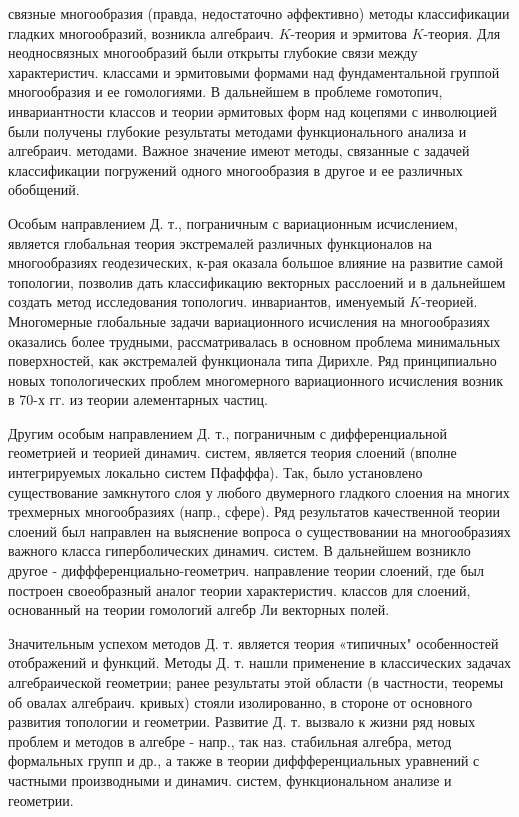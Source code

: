 \documentclass[10pt]{article}
\begin{document}
связные многообразия (правда, недостаточно әффективно) методы классификации гладких многообразий, возникла алгебраич. $K$-теория и эрмитова $K$-теория. Для неодносвязных многообразий были открыты глубокие связи между характеристич. классами и эрмитовыми формами над фундаментальной группой многообразия и ее гомологиями. В дальнейшем в проблеме гомотопич, инвариантности классов и теории әрмитовых форм над коцепями с инволюцией были получены глубокие результаты методами функционального анализа и алгебраич. методами. Важное значение имеют методы, связанные с задачей классификации погружений одного многообразия в другое и ее различных обобщений.



Особым направлением Д. т., пограничным с вариационным исчислением, является глобальная теория экстремалей различных функционалов на многообразиях геодезических, к-рая оказала большое влияние на развитие самой топологии, позволив дать классификацию векторных расслоений и в дальнейшем создать метод исследования топологич. инвариантов, именуемый $K$-теорией. Многомерные глобальные задачи вариационного исчисления на многообразиях оказались более трудными, рассматривалась в основном проблема минимальных поверхностей, как әкстремалей функционала типа Дирихле. Ряд принципиально новых топологических проблем многомерного вариационного исчисления возник в 70-х гг. из теории алементарных частиц.



Другим особым направлением Д. т., пограничным с дифференциальной геометрией и теорией динамич. систем, является теория слоений (вполне интегрируемых локально систем Пфафффа). Так, было установлено существование замкнутого слоя у любого двумерного гладкого слоения на многих трехмерных многообразиях (напр., сфере). Ряд результатов качественной теории слоений был направлен на выяснение вопроса о существовании на многообразиях важного класса гиперболических динамич. систем. В дальнейшем возникло другое - диффференциально-геометрич. направление теории слоений, где был построен своеобразный аналог теории характеристич. классов для слоений, основанный на теории гомологий алгебр Ли векторных полей.



Значительным успехом методов Д. т. является теория «типичных" особенностей отображений и функций. Методы Д. т. нашли применение в классических задачах алгебраической геометрии; ранее результаты этой области (в частности, теоремы об овалах алгебраич. кривых) стояли изолированно, в стороне от основного развития топологии и геометрии. Развитие Д. т. вызвало к жизни ряд новых проблем и методов в алгебре - напр., так наз. стабильная алгебра, метод формальных групп и др., а также в теории диффференциальных уравнений с частными производными и динамич. систем, функциональном анализе и геометрии.
\end{document}
